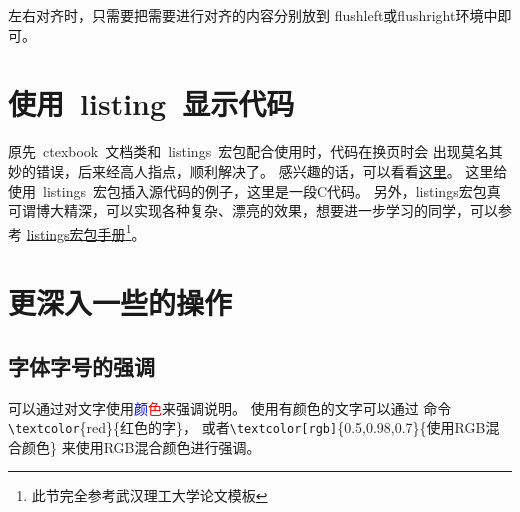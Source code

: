左右对齐时，只需要把需要进行对齐的内容分别放到 flushleft或flushright环境中即可。

\section{使用~listing~显示代码}
原先~ctexbook~文档类和~listings~宏包配合使用时，代码在换页时会
出现莫名其妙的错误，后来经高人指点，顺利解决了。
感兴趣的话，可以看看\href{http://bbs.ctex.org/viewthread.php?tid=53451}{这里}。
这里给使用~listings~宏包插入源代码的例子，这里是一段C代码。
另外，listings宏包真可谓博大精深，可以实现各种复杂、漂亮的效果，想要进一步学习的同学，可以参考
\href{http://mirror.ctan.org/macros/latex/contrib/listings/listings.pdf}
{listings宏包手册\footnote{此节完全参考武汉理工大学论文模板}}。

\section{更深入一些的操作}

\subsection{字体字号的强调}
可以通过对文字使用\textcolor{blue}{颜}\textcolor{red}{色}来强调说明。
使用\textcolor[rgb]{0.5,0.95,0.96}{有颜色的文字}可以通过
命令\texttt{\textbackslash textcolor}\{red\}\{红色的字\}，
或者\texttt{\textbackslash textcolor[rgb]}\{0.5,0.98,0.7\}\{使用RGB混合颜色\}
来\textcolor[rgb]{0.5,0.98,0.7}{使用RGB混合颜色}进行强调。

